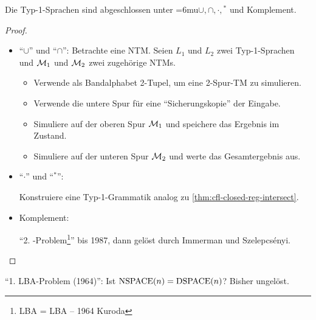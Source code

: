 \begin{Satz}
	Die Typ-1-Sprachen sind abgeschlossen unter {\thinmuskip=6mu$\cup,\cap,\cdot,{}^*$} und Komplement.
\end{Satz}
\begin{proof}~
    \begin{itemize}
     \item "`$\cup$"' und "`$\cap$"':
     Betrachte eine \ac{NTM}.
     Seien $L_1$ und $L_2$ zwei Typ-1-Sprachen und $\mathcal{M}_1$ und $\mathcal{M}_2$ zwei zugehörige \ac{NTM}s.
     \begin{itemize}
     
     \item Verwende als Bandalphabet 2-Tupel, um eine 2-Spur-\ac{TM} zu simulieren.
     \item Verwende die untere Spur für eine "`Sicherungskopie"' der Eingabe.
     \item Simuliere auf der oberen Spur $\mathcal{M}_1$ und speichere das Ergebnis im Zustand.
     \item Simuliere auf der unteren Spur $\mathcal{M}_2$ und werte das Gesamtergebnis aus.
     \end{itemize}
     \item  "`$\cdot$"' und "`$^*$"':
     
     Konstruiere eine Typ-1-Grammatik analog zu \autoref{thm:cfl-closed-reg-intersect}.
     
     \item Komplement:
     
     "`2. -Problem\footnote{\acs*{LBA} = \acl*{LBA} -- 1964 Kuroda}"' bis 1987, dann gelöst durch Immerman und Szelepcsényi.
     \qedhere
    \end{itemize}
\end{proof}
\begin{Bemerkung}
  "`1. \ac{LBA}-Problem (1964)"': Ist $\operatorname{NSPACE}(n) = \operatorname{DSPACE}(n)$? Bisher ungelöst.
\end{Bemerkung}


